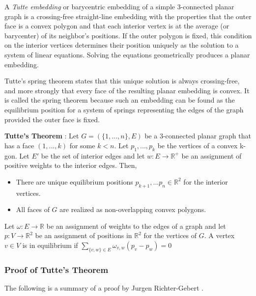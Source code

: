 \documentclass[11pt]{article}
\newcommand{\R}{\mathbb{R}}
\begin{document}
  A \emph{Tutte embedding} or barycentric embedding of a simple 3-connected planar graph is a crossing-free straight-line embedding with the properties that the outer face is a convex polygon and that each interior vertex is at the average (or barycenter) of its neighbor's positions. If the outer polygon is fixed, this condition on the interior vertices determines their position uniquely as the solution to a system of linear equations. Solving the equations geometrically produces a planar embedding. 
  
  Tutte's spring theorem states that this unique solution is always crossing-free, and more strongly that every face of the resulting planar embedding is convex. It is called the spring theorem because such an embedding can be found as the equilibrium position for a system of springs representing the edges of the graph provided the outer face is fixed.
 
 \textbf{Tutte's Theorem} \cite{realizationSpaces}: Let $G = (\{1,...,n\},E)$ be a 3-connected planar graph that has a face $(1,...,k)$ for some $k<n$. Let $p_1,...,p_k$ be the vertices of a convex k-gon. Let $E'$ be the set of interior edges and let $w : E \rightarrow \R^+$ be an assignment of positive weights to the interior edges. Then,
 	\begin{itemize}
		\item There are unique equilibrium positions $p_{k+1}, ...p_n \in \R^2$ for the interior vertices. 
		\item All faces of $G$ are realized as non-overlapping convex polygons.
	\end{itemize}
	
Let $\omega : E \rightarrow \R$ be an assignment of weights to the edges of a graph and let $p:V \rightarrow \R^2$ be an assignment of positions in $\R^2$ for the vertices of $G$. A vertex $v \in V$ is in equilibrium if  $\sum\limits_{\{v,w\} \in E} \omega_{v,w}(p_v - p_w) = 0$

\subsubsection{Proof of Tutte's Theorem}
The following is a summary of a proof by Jurgen Richter-Gebert \cite{realizationSpaces}.
\end{document}
